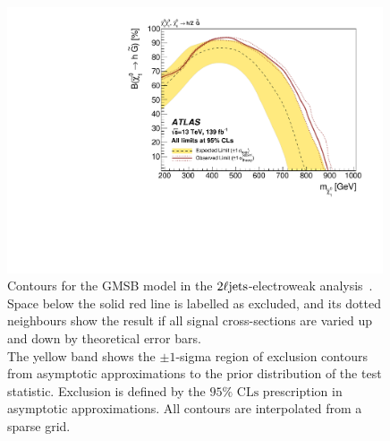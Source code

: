 \begin{figure}[tp]
\centering
\includegraphics[width=0.99\textwidth]{figures/2ljets_contours_gmsb.pdf}
\caption[
Contours for the GMSB model in the $\twoljets$-electroweak analysis
]{%
Contours for the GMSB model in the $\twoljets$-electroweak
analysis~\cite{atlas2022searches}.
\\[0.5em]
Space below the solid red line is labelled as excluded, and its dotted
neighbours show the result if all signal cross-sections are varied up and down
by theoretical error bars.
\\[0.5em]
The yellow band shows the $\pm1$-sigma region of exclusion contours
from asymptotic approximations to the prior distribution of the test statistic.
Exclusion is defined by the $95\%$ $\mathrm{CLs}$ prescription
in asymptotic approximations.
All contours are interpolated from a sparse grid.
}
\label{fig:2ljets_contours_gmsb}
\end{figure}

